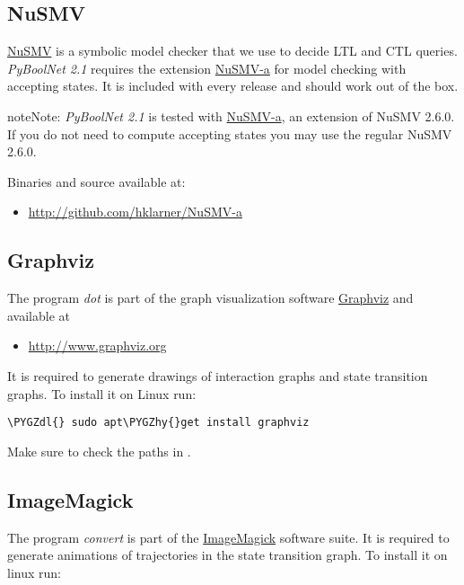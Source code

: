 \documentclass[letterpaper,10pt,english]{sphinxmanual}
\def\PYGZdl{\char`\$}
\def\PYGZhy{\char`\-}
\begin{document}
\subsection{NuSMV}
\label{Installation:nusmv}\label{Installation:installation-nusmv}
\href{http://nusmv.fbk.eu}{NuSMV} is a symbolic model checker that we use to decide LTL and CTL queries.
\emph{PyBoolNet 2.1} requires the extension \href{https://github.com/hklarner/NuSMV-a}{NuSMV-a} for model checking with accepting states.
It is included with every release and should work out of the box.

\begin{notice}{note}{Note:}
\emph{PyBoolNet 2.1} is tested with \href{https://github.com/hklarner/NuSMV-a}{NuSMV-a}, an extension of NuSMV 2.6.0. If you do not need to compute accepting states you may use the regular NuSMV 2.6.0.
\end{notice}

Binaries and source available at:
\begin{itemize}
\item {} 
\href{http://github.com/hklarner/NuSMV-a}{http://github.com/hklarner/NuSMV-a}

\end{itemize}


\subsection{Graphviz}
\label{Installation:graphviz}\label{Installation:installation-graphviz}
The program \emph{dot} is part of the graph visualization software \href{http://www.graphviz.org/}{Graphviz} and available at
\begin{itemize}
\item {} 
\href{http://www.graphviz.org}{http://www.graphviz.org}

\end{itemize}

It is required to generate drawings of interaction graphs and state transition graphs.
To install it on Linux run:

\begin{Verbatim}[commandchars=\\\{\}]
\PYGZdl{} sudo apt\PYGZhy{}get install graphviz
\end{Verbatim}

Make sure to check the paths in .


\subsection{ImageMagick}
\label{Installation:imagemagick}\label{Installation:installation-imagemagick}
The program \emph{convert} is part of the \href{http://www.imagemagick.org/script/index.php}{ImageMagick} software suite.
It is required to generate animations of trajectories in the state transition graph.
To install it on linux run:
\end{document}
